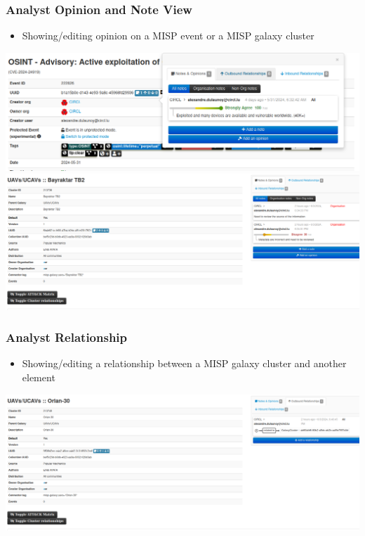 \begin{frame}
   \frametitle{Analyst Opinion and Note View}
   \begin{itemize}
        \item Showing/editing opinion on a MISP event or a MISP galaxy cluster
   \end{itemize}
   \begin{center}
        \includegraphics[scale=0.2]{opinion.png}
        \hspace{1cm}
        \includegraphics[scale=0.19]{note.png}
   \end{center}
\end{frame}

\begin{frame}
	\frametitle{Analyst Relationship}
	\begin{itemize}
	          \item Showing/editing a relationship between a MISP galaxy cluster and another element
	\end{itemize}
	\begin{center}
	\includegraphics[scale=0.2]{relationship.png}
	\end{center}
\end{frame}

